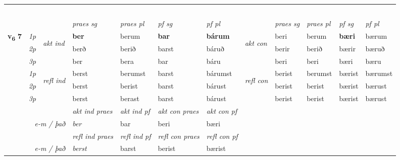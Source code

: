 \begin{longtable}[l]{X>{\footnotesize\itshape}llXXXXlXXXX}
\midrule
  & \\*
   & \\*
     & \\*
   & \\*
  & \\
   \midrule
 & &   & \textit{praes sg}  & \textit{praes pl}    & \textit{ pf sg} & \textit{pf pl} & & \textit{praes sg}  & \textit{praes pl}    & \textit{pf sg} & \textit{pf pl }  \\ \cmidrule{4-7} \cmidrule{9-12}
 \multirow{2}{*}{{{\textbf{v{\textsubscript{6}}} \Large{\textbf{7}}}}}  & 1p & \multirow{3}{*}{\begin{turn}{90}\textit{akt ind}\end{turn}} & \textbf{ber} & berum & \textbf{bar} & \textbf{bárum} & \multirow{3}{*}{\begin{turn}{90}\textit{akt con}\end{turn}} &beri & berum & \textbf{bæri} & bærum\\*
 & 2p &  &  berð  & berið & barst & báruð & & berir & berið & bærir & bæruð \\*
 & 3p &  & ber & bera & bar & báru & & beri & beri& bæri & bæru \\*
\cmidrule{4-7} \cmidrule{9-12}
 & 1p & \multirow{3}{*}{\begin{turn}{90}\textit{refl ind}\end{turn}}  & berst & berumst & barst & bárumst & \multirow{3}{*}{\begin{turn}{90}\textit{refl con}\end{turn}}  &berist & berumst & bærist & bærumst \\*
 & 2p &  & berst & berist & barst & bárust & &berist & berist & bærist & bærust \\*
 & 3p  & & berst & berast & barst & bárust & & berist & berist& bærist & bærust \\*
\cmidrule{4-7} \cmidrule{9-12}

   && &  \textit{akt ind praes} & \textit{akt ind pf} & \textit{akt con praes} & \textit{akt con pf} \\*
\multicolumn{3}{r}{\textit{e-m / það}} & ber & bar & beri & bæri \\*

\cmidrule{4-7}
 & && \textit{refl ind praes} & \textit{refl ind pf} & \textit{refl con praes} & \textit{refl con pf} \\*
\multicolumn{3}{r}{\textit{e-m / það}}& berst & barst & berist & bærist \\*


\end{longtable}
